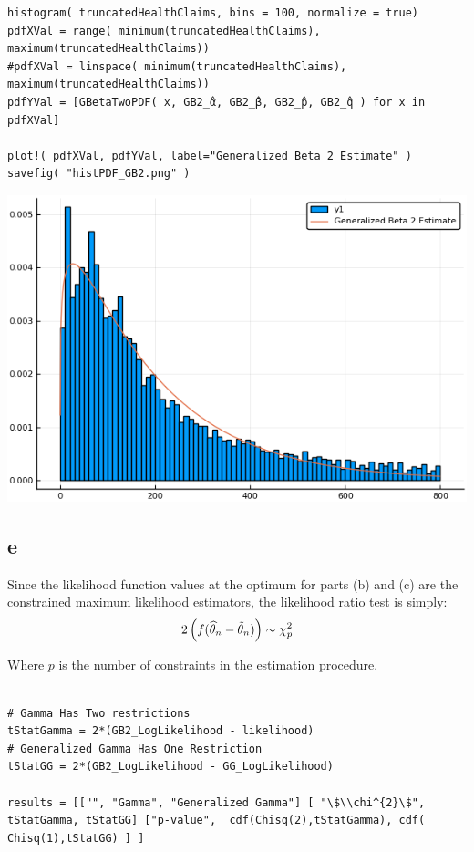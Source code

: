 \documentclass[12pt, letterpaper]{paper}
\begin{document}
\begin{verbatim}
histogram( truncatedHealthClaims, bins = 100, normalize = true)
pdfXVal = range( minimum(truncatedHealthClaims), maximum(truncatedHealthClaims))
#pdfXVal = linspace( minimum(truncatedHealthClaims), maximum(truncatedHealthClaims))
pdfYVal = [GBetaTwoPDF( x, GB2_̂α, GB2_̂β, GB2_̂p, GB2_̂q ) for x in pdfXVal]

plot!( pdfXVal, pdfYVal, label="Generalized Beta 2 Estimate" )
savefig( "histPDF_GB2.png" )
\end{verbatim}

\begin{center}
\includegraphics[width=.9\linewidth]{histPDF_GB2.png}
\end{center}

\subsection{e}
\label{sec:org13cb78f}
Since the likelihood function values at the optimum for parts (b) and
(c) are the constrained maximum likelihood estimators, the likelihood
ratio test is simply: 
\begin{equation*}
  2 \left( f( \widehat{ \theta }_{n} - \tilde{ \theta }_{n}) \right) \sim \chi_{p}^{2}
\end{equation*}

Where \(p\) is the number of constraints in the estimation procedure. 
\begin{verbatim}

# Gamma Has Two restrictions
tStatGamma = 2*(GB2_LogLikelihood - likelihood)
# Generalized Gamma Has One Restriction
tStatGG = 2*(GB2_LogLikelihood - GG_LogLikelihood)

results = [["", "Gamma", "Generalized Gamma"] [ "\$\\chi^{2}\$", tStatGamma, tStatGG] ["p-value",  cdf(Chisq(2),tStatGamma), cdf( Chisq(1),tStatGG) ] ]
\end{verbatim}
\end{document}

